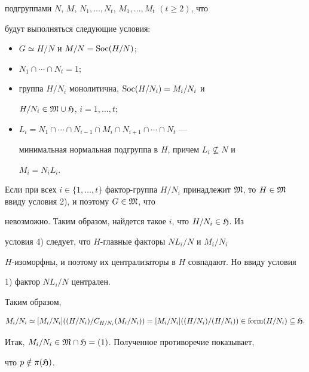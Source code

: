 \begin{pf}
подгруппами $N$, $M$, $N_1,\dotsc,N_t$, $M_1,\dotsc,M_t$ $(t\ge 2)$, что 


будут выполняться следующие условия: 


\begin{itemize} 


\item[1)] $G\simeq H/N$ и $M/N=\operatorname{Soc}(H/N)$; 


\item[2)] $N_1\cap\dotsb\cap N_t=1$; 


\item[3)] группа $H/N_i$ монолитична, $\operatorname{Soc}(H/N_i)=M_i/N_i$ и 


$H/N_i\in\frak M\cup\frak H$, $i=1,\dotsc,t$; 


\item[4)] $L_i=N_1\cap\dotsb\cap N_{i-1}\cap M_i\cap N_{i+1}\cap\dotsb\cap 


N_t$ --- 


минимальная нормальная подгруппа в $H$, причем $L_i\nsubseteq N$ и 


$M_i=N_iL_i$. 


\end{itemize} 


 


Если при всех $i\in\{1,\dotsc,t\}$ фактор-группа $H/N_i$ принадлежит $\frak 


M$, то $H\in\frak M$ ввиду условия 2), и поэтому $G\in\frak M$, что 


невозможно. Таким образом, найдется такое $i$, что $H/N_i\in\frak H$. Из 


условия 4) следует, что $H$-главные факторы $NL_i/N$ и $M_i/N_i$ 


$H$-изоморфны, и поэтому их централизаторы в $H$ совпадают. Но ввиду условия 


1) фактор $NL_i/N$ централен. 


 


Таким образом, 


$$ 


M_i/N_i\simeq[M_i/N_i]((H/N_i)/C_{H/N_i}(M_i/N_i))= 


[M_i/N_i]((H/N_i)/(H/N_i))\in\form(H/N_i)\subseteq\frak H. 


$$ 


Итак, $M_i/N_i\in\frak M\cap\frak H=(1)$. Полученное противоречие показывает, 


что $p\notin\pi(\frak H)$.


\end{pf} 


